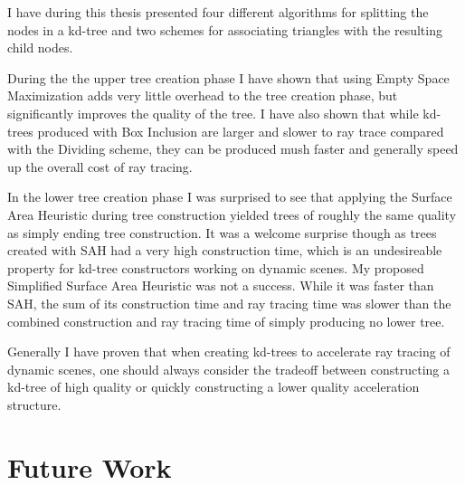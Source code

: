 
I have during this thesis presented four different algorithms for splitting the
nodes in a kd-tree and two schemes for associating triangles with the resulting
child nodes.

During the the upper tree creation phase I have shown that using Empty Space
Maximization adds very little overhead to the tree creation phase, but
significantly improves the quality of the tree. I have also shown that while
kd-trees produced with Box Inclusion are larger and slower to ray trace compared
with the Dividing scheme, they can be produced mush faster and generally speed
up the overall cost of ray tracing.

In the lower tree creation phase I was surprised to see that applying the
Surface Area Heuristic during tree construction yielded trees of roughly the
same quality as simply ending tree construction. It was a welcome surprise
though as trees created with SAH had a very high construction time, which is an
undesireable property for kd-tree constructors working on dynamic scenes. My
proposed Simplified Surface Area Heuristic was not a success. While it was
faster than SAH, the sum of its construction time and ray tracing time was
slower than the combined construction and ray tracing time of simply producing
no lower tree.



Generally I have proven that when creating kd-trees to accelerate ray tracing of
dynamic scenes, one should always consider the tradeoff between constructing a
kd-tree of high quality or quickly constructing a lower quality acceleration
structure.








\chapter{Future Work}\label{chp:future}


